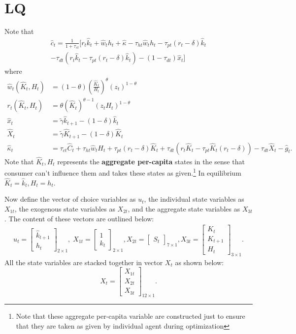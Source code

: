 \documentclass[12pt]{article}
\begin{document}
\section{LQ}
Note that \begin{multline*} \hat{c}_t = \frac{1}{1+ \tau_{ct}} \Big[r_t\hat{k}_t + \hat{w}_th_t + \hat{\kappa} -\tau_{ht}\hat{w}_th_t - \tau_{pt}(r_t - \delta)\hat{k}_t \\ -\tau_{dt}(r_t \hat{k}_t -\tau_{pt}(r_t -\delta)\hat{k}_t) -(1-\tau_{dt})\hat{x}_t \Big] 
\end{multline*}
where
\begin{align*}
\hat{w}_t(\hat{K}_t, H_t) & = (1-\theta)(\frac{\hat{K}_t}{H_t})^{\theta} (z_t)^{1-\theta}\\
r_t(\hat{K}_t, H_t) & = \theta (\hat{K}_t)^{\theta -1} (z_t H_t)^{1-\theta}\\
\hat{x}_t &= \tilde{\gamma}\hat{k}_{t+1} -(1-\delta)\hat{k}_t \\
\hat{X}_t & = \tilde{\gamma}\hat{K}_{t+1} -(1-\delta)\hat{K}_t \\
\hat{\kappa}_t & = \tau_{ct}\hat{C}_t + \tau_{ht}\hat{w}_tH_t + \tau_{pt}(r_t-\delta)\hat{K}_t + \tau_{dt}(r_t\hat{K}_t -\tau_{pt}\hat{K}_t(r_t -\delta))- \tau_{dt}\hat{X}_t - \hat{g}_t.
\end{align*}
Note that $\hat{K}_t, H_t$ represents the \textbf{aggregate per-capita} states in the sense that consumer can't influence them and takes these states as given.\footnote{Note that these aggregate per-capita variable are constructed just to ensure that they are taken as given by individual agent during optimization} In equilibrium $\hat{K}_t = \hat{k}_t, H_t = h_t$. 

Now define the vector of choice variables as $u_t$, the individual state variables as $X_{1t}$, the exogenous state variables as $X_{2t}$, and the aggregate state variables as $X_{3t}$. The content of these vectors are outlined below: \begin{align*}
	u_t = \begin{bmatrix}
		\hat{k}_{t+1} \\
		h_t
	\end{bmatrix}_{2 \times 1}, \; X_{1t} = \begin{bmatrix} 1 \\ k_t \end{bmatrix}_{2\times 1}, X_{2t} = \begin{bmatrix} S_t \end{bmatrix}_{7\times 1}, X_{3t} = \begin{bmatrix}
K_t \\ K_{t+1} \\ H_t 
\end{bmatrix}_{3 \times 1}. 
\end{align*}
All the state variables are stacked together in vector $X_t$ as shown below:
$$X_t = \begin{bmatrix} X_{1t} \\ X_{2t} \\ X_{3t} \end{bmatrix}_{12 \times 1}.$$
\end{document}
